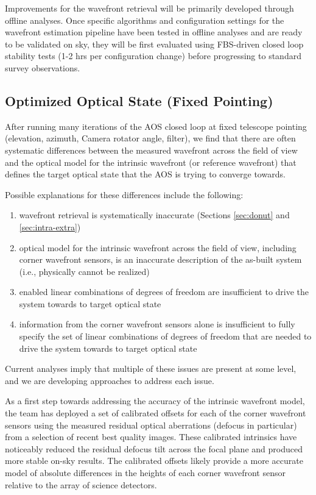 \documentclass[SO,lsst,authoryear,toc]{lsstdoc}
\begin{document}
Improvements for the wavefront retrieval will be primarily developed through offline analyses.
Once specific algorithms and configuration settings for the wavefront estimation pipeline have been tested in offline analyses and are ready to be validated on sky, they will be first evaluated using FBS-driven closed loop stability tests (1-2 hrs per configuration change) before progressing to standard survey observations.

\subsection{Optimized Optical State (Fixed Pointing)}
\label{sec:optical_state_fixed}

After running many iterations of the AOS closed loop at fixed telescope pointing (elevation, azimuth, Camera rotator angle, filter), we find that there are often systematic differences between the measured wavefront across the field of view and the optical model for the intrinsic wavefront (or reference wavefront) that defines the target optical state that the AOS is trying to converge towards.

Possible explanations for these differences include the following:
\begin{enumerate}
  \item wavefront retrieval is systematically inaccurate (Sections \ref{sec:donut} and \ref{sec:intra-extra})
  \item optical model for the intrinsic wavefront across the field of view, including corner wavefront sensors, is an inaccurate description of the as-built system (i.e., physically cannot be realized)
  \item enabled linear combinations of degrees of freedom are insufficient to drive the system towards to target optical state
  \item information from the corner wavefront sensors alone is insufficient to fully specify the set of linear combinations of degrees of freedom that are needed to drive the system towards to target optical state
\end{enumerate}

Current analyses imply that multiple of these issues are present at some level, and we are developing approaches to address each issue.

As a first step towards addressing the accuracy of the intrinsic wavefront model, the team has deployed a set of calibrated offsets for each of the corner wavefront sensors using the measured residual optical aberrations (defocus in particular) from a selection of recent best quality images. These calibrated intrinsics have noticeably reduced the residual defocus tilt across the focal plane and produced more stable on-sky results. The calibrated offsets likely provide a more accurate model of absolute differences in the heights of each corner wavefront sensor relative to the array of science detectors.
\end{document}

